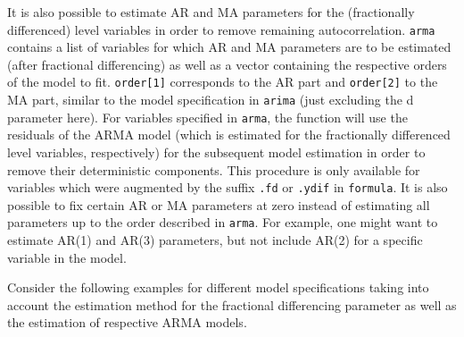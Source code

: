\documentclass[12pt]{paper}\usepackage[]{graphicx}\usepackage[]{color}
\begin{document}
It is also possible to estimate AR and MA parameters for the (fractionally differenced) level variables in order to remove remaining autocorrelation. \texttt{arma} contains a list of variables for which AR and MA parameters are to be estimated (after fractional differencing) as well as a vector containing the respective orders of the model to fit. \texttt{order[1]} corresponds to the AR part and \texttt{order[2]} to the MA part, similar to the model specification in \texttt{arima} (just excluding the d parameter here). For variables specified in \texttt{arma}, the function will use the residuals of the ARMA model (which is estimated for the fractionally differenced level variables, respectively) for the subsequent model estimation in order to remove their deterministic components. This procedure is only available for variables which were augmented by the suffix \texttt{.fd} or \texttt{.ydif} in \texttt{formula}. It is also possible to fix certain AR or MA parameters at zero instead of estimating all parameters up to the order described in \texttt{arma}. For example, one might want to estimate AR(1) and AR(3) parameters, but not include AR(2) for a specific variable in the model.

Consider the following examples for different model specifications taking into account the estimation method for the fractional differencing parameter as well as the estimation of respective ARMA models.
\end{document}

